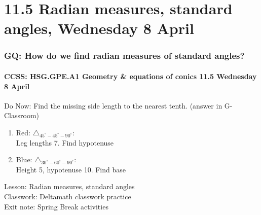 \documentclass{beamer}
\begin{document}
\section{11.5 Radian measures, standard angles, Wednesday 8 April} 
\frame
{
  \frametitle{GQ: How do we find radian measures of standard angles?}
  \framesubtitle{CCSS: HSG.GPE.A1 Geometry \& equations of conics \hfill \alert{11.5 Wednesday 8 April}}

  \begin{block}{Do Now: Find the missing side length to the nearest tenth. (answer in G-Classroom)}
    \begin{multicols}{2}
      \begin{enumerate}
        \item Red: $\triangle_{45^\circ - 45^\circ - 90^\circ}$: \\
        Leg lengths 7. Find hypotenuse
        \item Blue: $\triangle_{30^\circ - 60^\circ - 90^\circ}$: \\
        Height 5, hypotenuse 10. Find base
      \end{enumerate}
      \begin{flushright}
    \end{flushright}
    \end{multicols}
    \end{block}

    Lesson: Radian measures, standard angles \\ 
    Classwork: Deltamath classwork practice\\ 
    Exit note: Spring Break activities
}
\end{document}
